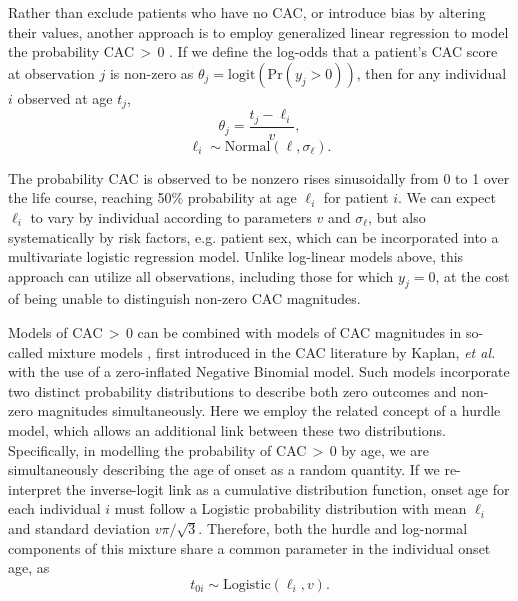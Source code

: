 \documentclass[aps,pre,twocolumn,twoside,tightenlines,groupedaddress,amsmath,amssymb,nobibnotes,final,showkeys,letterpaper]{revtex4-2}
\begin{document}
Rather than exclude patients who have no CAC, or introduce bias by altering their values, another approach is to employ generalized linear regression to model the probability CAC\,$>$\,0 \cite{vliegenthart2002rotterdam, kondos2003events, taylor2005premature, vliegenthart2005elderly, schmermund2006heinz, santos2006international, nasir2007mortality, lakoski2007lowriskwomen, budoff2007long, lutsey2008acculturation,okwuosa2011lowrisk, yu2013korean, aboyans2011peripheral, whelton2015predictors}. If we define the log-odds that a patient's CAC score at observation $j$ is non-zero as $\theta_j = \mathrm{logit}(\mathrm{Pr}(y_j>0))$, then for any individual $i$ observed at age $t_j$,
\begin{equation}
  \label{eq:logit}
  \theta_j = \frac{t_j - \ell_i}{v},
\end{equation}
$$
  \ell_i \sim \mathrm{Normal}(\ell, \sigma_\ell).
$$

The probability CAC is observed to be nonzero rises sinusoidally from 0 to 1 over the life course, reaching 50\% probability at age $\ell_i$ for patient $i$. We can expect $\ell_i$ to vary by individual according to parameters $v$ and $\sigma_\ell$, but also systematically by risk factors, e.g. patient sex, which can be incorporated into a multivariate logistic regression model. Unlike log-linear models above, this approach can utilize all observations, including those for which $y_j = 0$, at the cost of being unable to distinguish non-zero CAC magnitudes.

Models of CAC\,$>$\,0 can be combined with models of CAC magnitudes in so-called mixture models \cite{mcelreath2020rethinking}, first introduced in the CAC literature by Kaplan, \textit{et al.} \cite{kaplan2017tsimane} with the use of a zero-inflated Negative Binomial model. Such models incorporate two distinct probability distributions to describe both zero outcomes and non-zero magnitudes simultaneously. Here we employ the related concept of a hurdle model, which allows an additional link between these two distributions. Specifically, in modelling the probability of CAC\,$>$\,0 by age, we are simultaneously describing the age of onset as a random quantity. If we re-interpret the inverse-logit link as a cumulative distribution function, onset age for each individual $i$ must follow a Logistic probability distribution with mean $\ell_i$ and standard deviation $v \pi/ \sqrt{3}$. Therefore, both the hurdle and log-normal components of this mixture share a common parameter in the individual onset age, as
$$
  t_{0i} \sim \mathrm{Logistic}(\ell_i, v).
$$
\end{document}
